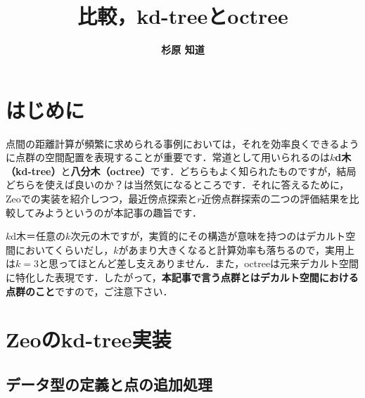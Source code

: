 ﻿\documentclass[a4paper]{jsarticle}
\title{\bf 比較，kd-treeとoctree}
\author{\Large{\bf 杉原 知道}}
\date{}
\begin{document}
\maketitle
\vspace{-\baselineskip}

\section{はじめに}

点間の距離計算が頻繁に求められる事例においては，それを効率良くできるように点群の空間配置を表現することが重要です．常道として用いられるのは{\bf $k$d木（kd-tree）}と{\bf 八分木（octree）}です．どちらもよく知られたものですが，結局どちらを使えば良いのか？は当然気になるところです．それに答えるために，Zeoでの実装を紹介しつつ，最近傍点探索と$r$近傍点群探索の二つの評価結果を比較してみようというのが本記事の趣旨です．

$k$d木＝任意の$k$次元の木ですが，実質的にその構造が意味を持つのはデカルト空間においてくらいだし，$k$があまり大きくなると計算効率も落ちるので，実用上は$k=3$と思ってほとんど差し支えありません．また，octreeは元来デカルト空間に特化した表現です．したがって，{\bf 本記事で言う点群とはデカルト空間における点群のこと}ですので，ご注意下さい．


\section{Zeoのkd-tree実装}

\subsection{データ型の定義と点の追加処理}
\end{document}
